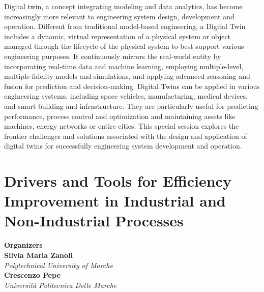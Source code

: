 Digital twin, a concept integrating modeling and data analytics, has become increasingly more relevant to engineering system design, development and operation. Different from traditional model-based engineering, a Digital Twin includes a dynamic, virtual representation of a physical system or object managed through the lifecycle of the physical system to best support various engineering purposes. It continuously mirrors the real-world entity by incorporating real-time data and machine learning, employing multiple-level, multiple-fidelity models and simulations, and applying advanced reasoning and fusion for prediction and decision-making. Digital Twins can be applied in various engineering systems, including space vehicles, manufacturing, medical devices, and smart building and infrastructure. They are particularly useful for predicting performance, process control and optimization and maintaining assets like machines, energy networks or entire cities. This special session explores the frontier challenges and solutions associated with the design and application of digital twins for successfully engineering system development and operation. 

\section{Drivers and Tools for Efficiency Improvement in Industrial and Non-Industrial Processes}


\large \textbf{Organizers} \normalsize \vspace{2mm} \\
\textbf{Silvia Maria  Zanoli} \\ 
\textit{Polytechnical University of Marche} \vspace{{2mm}} \\
\textbf{Crescenzo  Pepe} \\ 
\textit{Università Politecnica Delle Marche}

